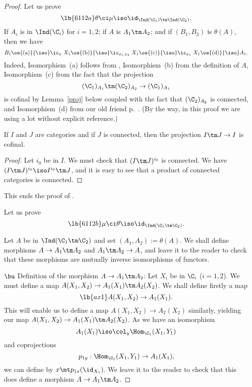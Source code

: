\documentclass[12pt]{article}
\theoremstyle{remark}
\theoremstyle{definition}
\begin{document}
\begin{proof}
Let us prove
\begin{equation}\lb{6112a}
\theta\ci\mu\iso\id_{\Ind(\C_1)\tm\Ind(\C_2)}.
\end{equation}
If $A_i$ is in $\Ind(\C_i)$ for $i=1,2$; if $A$ is $A_1\tm A_2$; and if $(B_1,B_2)$ is $\theta(A)$, then we have 
$$ 
B_1
\os{\text{(a)}}{\iso}\ic_x\ X_1
\os{\text{(b)}}{\iso}\ic_{x_1,x_2}\ X_1
\os{\text{(c)}}{\iso}\ic_{x_1}\ X_1
\os{\text{(d)}}{\iso}A_1.
$$ 
Indeed, Isomorphism~(a) follows from , Isomorphism~(b) from the definition of $A$, Isomorphism~(c) from the fact that the projection 
$$
(\C_1)_{A_1}\tm(\C_2)_{A_2}\to(\C_1)_{A_1}
$$ 
is cofinal by Lemma~\ref{proj} below coupled with the fact that $(\C_2)_{A_2}$ is connected, and Isomorphism~(d) from our old friend  p.~. (By the way, in this proof we are using  a lot without explicit reference.)

\begin{lem}
If $I$ and $J$ are categories and if $J$ is connected, then the projection $I\tm J\to I$ is cofinal.
\end{lem}

\begin{proof}
Let $i_0$ be in $I$. We must check that $(I\tm J)^{i_0}$ is connected. We have $(I\tm J)^{i_0}\iso I^{i_0}\tm J$, and it is easy to see that a product of connected categories is connected. 
\end{proof}

This ends the proof of .

Let us prove
\begin{equation}\lb{6112b}
\mu\ci\theta\iso\id_{\Ind(\C_1\tm\C_2)}.
\end{equation}

Let $A$ be in $\Ind(\C_1\tm\C_2)$ and set $(A_1,A_2):=\theta(A)$. We shall define morphisms $A\to A_1\tm A_2$ and $A_1\tm A_2\to A$, and leave it to the reader to check that these morphisms are mutually inverse isomorphisms of functors. 

\nn$\bu$ Definition of the morphism $A\to A_1\tm A_2$: Let $X_i$ be in $\C_i$ ($i=1,2$). We must define a map $A(X_1,X_2)\to A_1(X_1)\tm A_2(X_2)$. We shall define firstly a map 
\begin{equation}\lb{ax1}
A(X_1,X_2)\to A_1(X_1).%
\end{equation}%
This will enable us to define a map $A(X_1,X_2)\to A_2(X_2)$ %
similarly, yielding our map $A(X_1,X_2)\to A_1(X_1)\tm A_2(X_2)$. As we have an isomorphism 
$$
A_1(X_1)\iso\col_y\Hom_{\C_1}(X_1,Y_1)
$$ 
and coprojections 
$$
p_{1y}:\Hom_{\C_1}(X_1,Y_1)\to A_1(X_1),
$$ 
we can define  %
by $x\mt p_{1x}(\id_{X_1})$. We leave it to the reader to check that this does define a morphism $A\to A_1\tm A_2$.


\end{proof}
\end{document}
